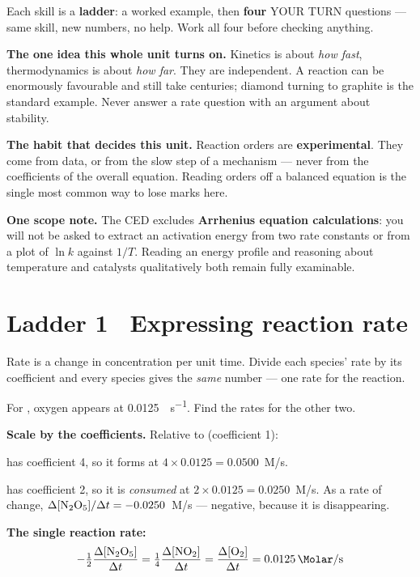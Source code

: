 \documentclass{apchem-worksheet}
\begin{document}
\apctitleblock

\begin{apcnote}
Each skill is a \textbf{ladder}: a worked example, then \textbf{four}
YOUR TURN questions --- same skill, new numbers, no help. Work all four
before checking anything.

\textbf{The one idea this whole unit turns on.} Kinetics is about
\emph{how fast}, thermodynamics is about \emph{how far}. They are
independent. A reaction can be enormously favourable and still take
centuries; diamond turning to graphite is the standard example. Never
answer a rate question with an argument about stability.

\textbf{The habit that decides this unit.} Reaction orders are
\textbf{experimental}. They come from data, or from the slow step of a
mechanism --- never from the coefficients of the overall equation. Reading
orders off a balanced equation is the single most common way to lose marks
here.

\textbf{One scope note.} The CED excludes \textbf{Arrhenius equation
calculations}: you will not be asked to extract an activation energy from
two rate constants or from a plot of $\ln k$ against $1/T$. Reading an
energy profile and reasoning about temperature and catalysts qualitatively
both remain fully examinable.
\end{apcnote}

\section*{\sffamily Ladder 1 \textbullet\ Expressing reaction rate}

Rate is a change in concentration per unit time. Divide each species'
rate by its coefficient and every species gives the \emph{same} number ---
one rate for the reaction.

\begin{workedexample}
For , oxygen appears at
\SI{0.0125}{\Molar\per\second}. Find the rates for the other two.

\textbf{Scale by the coefficients.} Relative to  (coefficient 1):

 has coefficient 4, so it forms at
$4 \times 0.0125 = \mathbf{0.0500}$~M/s.

 has coefficient 2, so it is \emph{consumed} at
$2 \times 0.0125 = \mathbf{0.0250}$~M/s. As a rate of change,
$\Delta[\ce{N2O5}]/\Delta t = -0.0250$~M/s --- negative, because it is
disappearing.

\textbf{The single reaction rate:}
\[ -\tfrac{1}{2}\frac{\Delta[\ce{N2O5}]}{\Delta t}
   = \tfrac{1}{4}\frac{\Delta[\ce{NO2}]}{\Delta t}
   = \frac{\Delta[\ce{O2}]}{\Delta t} = \SI{0.0125}{\Molar\per\second} \]
\end{workedexample}
\end{document}
